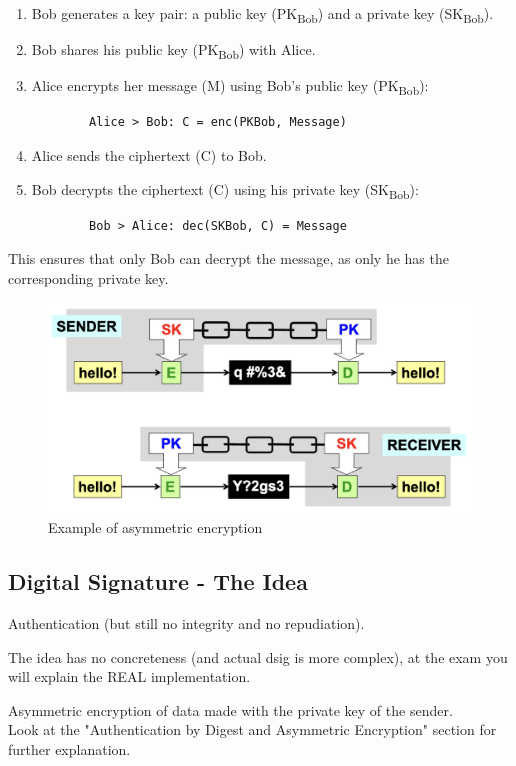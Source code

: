 \begin{enumerate}
    \item Bob generates a key pair: a public key (PK\textsubscript{Bob}) and a private key (SK\textsubscript{Bob}).
    \item Bob shares his public key (PK\textsubscript{Bob}) with Alice.
    \item Alice encrypts her message (M) using Bob's public key (PK\textsubscript{Bob}):
    \begin{verbatim}
        Alice > Bob: C = enc(PKBob, Message)
    \end{verbatim}
    \item Alice sends the ciphertext (C) to Bob.
    \item Bob decrypts the ciphertext (C) using his private key (SK\textsubscript{Bob}):
    \begin{verbatim}
        Bob > Alice: dec(SKBob, C) = Message
    \end{verbatim}
\end{enumerate}

This ensures that only Bob can decrypt the message, as only he has the corresponding private key.

\begin{figure}[H]
    \centering
    \includegraphics[width=0.5\linewidth]{Images/Cryptography/asymmCrypto.png}
    \caption{Example of asymmetric encryption}
\end{figure}


\subsection{Digital Signature - The Idea}
\begin{center}
    Authentication (but still no integrity and no repudiation).
\end{center}
\begin{tcolorbox}[colback=red!10!white, colframe=red!70!black, coltitle=white, title=Beware]
The idea has no concreteness (and actual dsig is more complex), at the exam you will explain the REAL implementation.
\end{tcolorbox}
\begin{center}
Asymmetric encryption of data made with the private key of the sender. \\ 
Look at the "Authentication by Digest and Asymmetric Encryption" section for further explanation.
\end{center}

